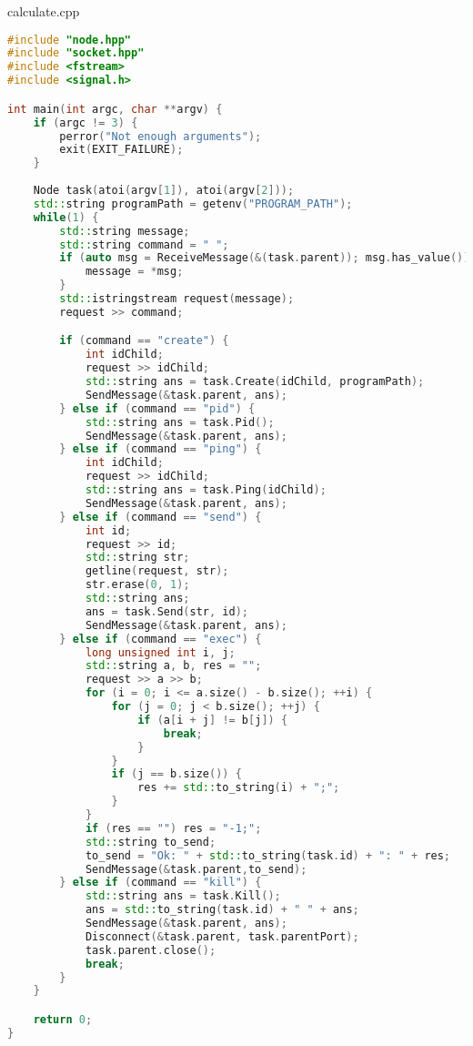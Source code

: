 \documentclass[a4paper, 12pt]{article}
\begin{document}
calculate.cpp
\begin{lstlisting}[language=C++]
#include "node.hpp"
#include "socket.hpp"
#include <fstream>
#include <signal.h>

int main(int argc, char **argv) {
    if (argc != 3) {
        perror("Not enough arguments");
        exit(EXIT_FAILURE);
    }
    
    Node task(atoi(argv[1]), atoi(argv[2]));
    std::string programPath = getenv("PROGRAM_PATH");
    while(1) {
        std::string message;
        std::string command = " ";
        if (auto msg = ReceiveMessage(&(task.parent)); msg.has_value()) {
            message = *msg;
        }
        std::istringstream request(message);
        request >> command;

        if (command == "create") {
            int idChild;
            request >> idChild;
            std::string ans = task.Create(idChild, programPath);
            SendMessage(&task.parent, ans);
        } else if (command == "pid") {
            std::string ans = task.Pid();
            SendMessage(&task.parent, ans);
        } else if (command == "ping") {
            int idChild;
            request >> idChild;
            std::string ans = task.Ping(idChild);
            SendMessage(&task.parent, ans);
        } else if (command == "send") {
            int id;
            request >> id;
            std::string str;
            getline(request, str);
            str.erase(0, 1);
            std::string ans;
            ans = task.Send(str, id);
            SendMessage(&task.parent, ans);
        } else if (command == "exec") {
            long unsigned int i, j;
            std::string a, b, res = "";
            request >> a >> b;
            for (i = 0; i <= a.size() - b.size(); ++i) {
                for (j = 0; j < b.size(); ++j) {
                    if (a[i + j] != b[j]) {
                        break;
                    }
                }
                if (j == b.size()) {
                    res += std::to_string(i) + ";";
                }
            }
            if (res == "") res = "-1;";
            std::string to_send;
            to_send = "Ok: " + std::to_string(task.id) + ": " + res;
            SendMessage(&task.parent,to_send);
        } else if (command == "kill") {
            std::string ans = task.Kill();
            ans = std::to_string(task.id) + " " + ans;
            SendMessage(&task.parent, ans);
            Disconnect(&task.parent, task.parentPort);
            task.parent.close();
            break;
        }
    }

    return 0;
}
\end{lstlisting}
\end{document}
